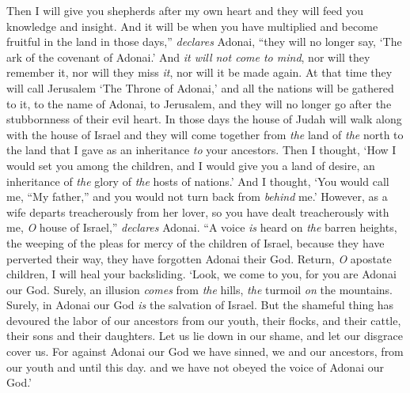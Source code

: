 \begin{biblechapter}
\verse Then I will give you shepherds after my own heart and they will feed you knowledge and insight.
\verse And it will be when you have multiplied and become fruitful in the land in those days,” \textit{declares} Adonai, “they will no longer say, ‘The ark of the covenant of Adonai.’ And \textit{it will not come to mind}, nor will they remember it, nor will they miss \textit{it}, nor will it be made again.
\verse At that time they will call Jerusalem ‘The Throne of Adonai,’ and all the nations will be gathered to it, to the name of Adonai, to Jerusalem, and they will no longer go after the stubbornness of their evil heart.
\verse In those days the house of Judah will walk along with the house of Israel and they will come together from \textit{the} land of \textit{the} north to the land that I gave as an inheritance \textit{to} your ancestors.
\verse Then I thought, ‘How I would set you among the children, 
and I would give you a land of desire, 
an inheritance of \textit{the} glory of \textit{the} hosts of nations.’ 
And I thought, ‘You would call me, “My father,” 
and you would not turn back from \textit{behind} me.’
\verse However, as a wife departs treacherously from her lover, 
so you have dealt treacherously with me, 
\textit{O} house of Israel,” \textit{declares} Adonai.
\verse “A voice \textit{is} heard on \textit{the} barren heights, 
the weeping of the pleas for mercy of the children of Israel, 
because they have perverted their way, 
they have forgotten Adonai their God.
\verse Return, \textit{O} apostate children, 
I will heal your backsliding. 
‘Look, we come to you, 
for you are Adonai our God.
\verse Surely, an illusion \textit{comes} from \textit{the} hills, 
\textit{the} turmoil \textit{on} the mountains. 
Surely, in Adonai our God 
\textit{is} the salvation of Israel.
\verse But the shameful thing has devoured 
the labor of our ancestors from our youth, 
their flocks, and their cattle, 
their sons and their daughters.
\verse Let us lie down in our shame, 
and let our disgrace cover us. 
For against Adonai our God we have sinned, 
we and our ancestors, 
from our youth and until this day. 
and we have not obeyed the voice of Adonai our God.’
\end{biblechapter}

